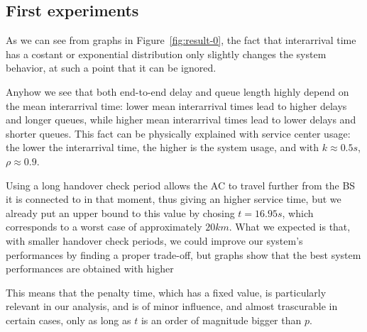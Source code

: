 \documentclass[a4paper,12pt]{article}
\begin{document}
\subsection{First experiments}
As we can see from graphs in Figure~\ref{fig:result-0}, the fact that interarrival time has a costant or exponential distribution only slightly changes the system behavior, at such a point that it can be ignored.

Anyhow we see that both end-to-end delay and queue length highly depend on the mean interarrival time: lower mean interarrival times lead to higher delays and longer queues, while higher mean interarrival times lead to lower delays and shorter queues.
This fact can be physically explained with service center usage: the lower the interarrival time, the higher is the system usage, and with $k \approx 0.5s$, $\rho \approx 0.9$.

Using a long handover check period allows the AC to travel further from the BS it is connected to in that moment, thus giving an higher service time, but we already put an upper bound to this value by chosing $t = 16.95s$, which corresponds to a worst case of approximately $20 km$.
What we expected is that, with smaller handover check periods, we could improve our system's performances by finding a proper trade-off, but graphs show that the best system performances are obtained with higher

This means that the penalty time, which has a fixed value, is particularly relevant in our analysis, and is of minor influence, and almost trascurable in certain cases, only as long as $t$ is an order of magnitude bigger than $p$.
\end{document}
